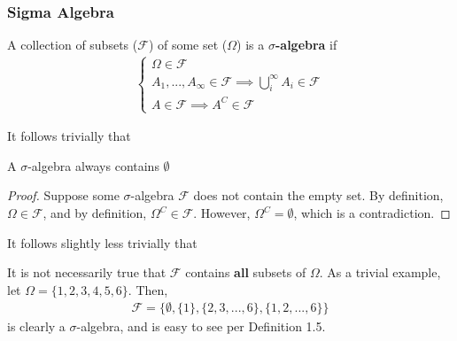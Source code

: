 \subsubsection{Sigma Algebra}
\begin{definition}
    A collection of subsets ($\mathcal{F}$) of some set ($\Omega$) is a \textbf{$\sigma$-algebra} if
    \begin{align}
        \begin{cases}
            \Omega \in \mathcal{F}\\
            A_1, ..., A_\infty \in \mathcal{F} \implies \bigcup_i^\infty A_i \in \mathcal{F}\\
            A \in \mathcal{F} \implies A^C \in \mathcal{F}
        \end{cases}
    \end{align}
\end{definition}
It follows trivially that
\begin{lemma}
    A $\sigma$-algebra always contains $\emptyset$
\end{lemma}
\begin{proof}
    Suppose some $\sigma$-algebra $\mathcal{F}$ does not contain the empty set. By definition, $\Omega \in \mathcal{F}$, and by definition, $\Omega^C \in \mathcal{F}$. However, $\Omega^C = \emptyset$, which is a contradiction.
\end{proof}
It follows slightly less trivially that
\begin{example}
    It is not necessarily true that $\mathcal{F}$ contains \textbf{all} subsets of $\Omega$. As a trivial example, let $\Omega = \{ 1, 2, 3, 4, 5, 6 \}$. Then,
    \begin{align}
        \mathcal{F} = \{ \emptyset, \{ 1 \}, \{ 2, 3, ..., 6 \}, \{ 1, 2, ..., 6 \} \}
    \end{align}
    is clearly a $\sigma$-algebra, and is easy to see per Definition 1.5.
\end{example}

